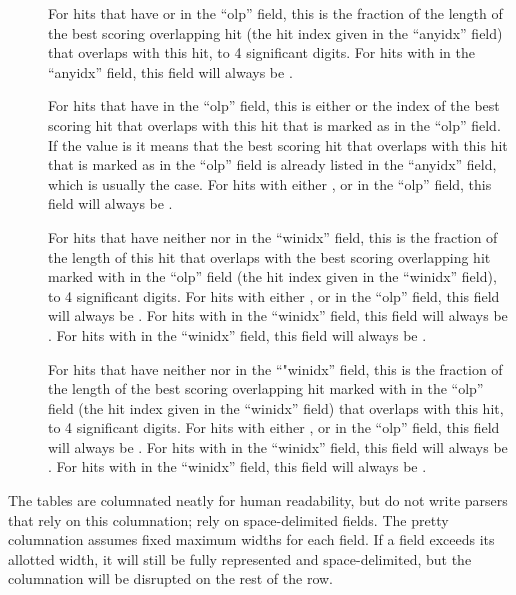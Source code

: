 \begin{description}
\item[]
For hits that have \ccode{=} or \ccode{\$} in the ``olp'' field, this is the
fraction of the length of the best scoring overlapping hit (the hit
index given in the ``anyidx'' field) that overlaps with this hit,
to 4 significant digits. 
For hits with \ccode{-} in the ``anyidx''
field, this field will always be \ccode{-}.  

\item[] 
For hits that have \ccode{=} in the ``olp'' field, this is either
 or the index of the best scoring hit that overlaps with this
hit that is marked as \ccode{\^} in the ``olp'' field. If the value
is  it means that the best scoring hit that overlaps with
this hit that is marked as \ccode{\^} in the ``olp'' field is
already listed in the ``anyidx'' field, which is usually the case.
For hits with either \ccode{*}, \ccode{\^} or \ccode{\$} in the ``olp'' field,
this field will always be \ccode{-}.

\item[]
For hits that have neither \ccode{-} nor  in the
``winidx'' field, this is the fraction of the length of this hit
that overlaps with the best scoring overlapping hit marked with
\ccode{\^} in the ``olp'' field (the hit index given in the
``winidx'' field), to 4 significant digits.  For hits with either
\ccode{*}, \ccode{\^} or \ccode{\$} in the ``olp'' field, this field will
always be \ccode{-}.  For hits with \ccode{-} in the ``winidx''
field, this field will always be \ccode{-}.  
For hits with  in the ``winidx''
field, this field will always be .  

\item[]
For hits that have neither \ccode{-} nor  in the
``"winidx'' field, this is the
fraction of the length of the best scoring overlapping hit marked with
\ccode{\^} in the ``olp'' field (the hit
index given in the ``winidx'' field) that overlaps with this hit,
to 4 significant digits. 
For hits with either 
\ccode{*}, \ccode{\^} or \ccode{\$} in the ``olp'' field, this field will
always be \ccode{-}.  For hits with \ccode{-} in the ``winidx''
field, this field will always be \ccode{-}.  
For hits with  in the ``winidx''
field, this field will always be .  

\end{description}

The tables are columnated neatly for human readability, but do not
write parsers that rely on this columnation; rely on space-delimited
fields. The pretty columnation assumes fixed maximum widths for each
field. If a field exceeds its allotted width, it will still be fully
represented and space-delimited, but the columnation will be disrupted
on the rest of the row.

